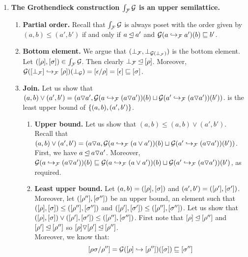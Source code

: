 \begin{enumerate}
\item {\bf The Grothendieck construction $\grothy{\ulbF}{\ulbG}$ is an upper semilattice.}
  \begin{enumerate}
  \item {\bf Partial order.}
    Recall that $\grothy{\ulbF}{\ulbG}$ is always poset
    with the order given by $(a,b) \leq (a',b')$ if and only if
    $a \leqF a'$ and $\ulbG(\ptF{a'}{a})(b) \permle b'$.
  \item {\bf Bottom element.}
    We argue that $(\bot_{\ulbF},\bot_{\ulbG(\bot_\ulbF)})$ is the bottom
    element. Let $(\cls{\redseq},\cls{\redseqtwo}) \in \grothy{\ulbF}{\ulbG}$.
    Then clearly $\bot_{\ulbF} \leqF \cls{\redseq}$. Moreover,
    $
     \ulbG(\ptF{[\redseq]}{[\bot_{\ulbF}]})(\bot_\ulbG) =
     [\emptyDerivation/\redseq] = [\emptyDerivation] \permle \cls{\redseqtwo}
    $.
  \item {\bf Join.}
    Let us show that $(a, b) \lor (a',b') = (a \lorF a', \ulbG(\ptF{(a \lorF a')}{a})(b) \sqcup \ulbG(\ptF{(a \lorF a')}{a'})(b'))$.
    is the least upper bound of $\set{(a, b), (a',b')}$.
    \begin{enumerate}
    \item {\bf Upper bound.}
      Let us show that $(a, b) \leq (a, b) \lor (a',b')$.
      Recall that $(a, b) \lor (a', b') = (a \lorF a, \ulbG(\ptF{(a \lor a')}{a})(b) \sqcup \ulbG(\ptF{(a \lorF a')}{a'})(b'))$.
      First, we have $a \leqF a \lorF a'$.
      Moreover, $\ulbG(\ptF{(a \lorF a')}{a})(b) \permle \ulbG(\ptF{(a \lor a')}{a})(b) \sqcup \ulbG(\ptF{(a \lorF a')}{a'})(b')$, as required.
    \item {\bf Least upper bound.}
      Let $(a,b) = (\cls{\redseq},\cls{\redseqtwo})$
      and $(a',b') = (\cls{\redseq'},\cls{\redseqtwo'})$.
      Moreover, let $(\cls{\redseq''},\cls{\redseqtwo''})$ be an upper bound,
      \ie an element
      such that $(\cls{\redseq},\cls{\redseqtwo}) \leq (\cls{\redseq''},\cls{\redseqtwo''})$
      and $(\cls{\redseq'},\cls{\redseqtwo'}) \leq (\cls{\redseq''},\cls{\redseqtwo''})$.
      Let us show that
      $(\cls{\redseq},\cls{\redseqtwo}) \lor (\cls{\redseq'},\cls{\redseqtwo'}) \leq (\cls{\redseq''},\cls{\redseqtwo''})$.
      First note that $\cls{\redseq} \leqF \cls{\redseq''}$ and $\cls{\redseq'} \leqF \cls{\redseq''}$
      so $\cls{\redseq} \lorF \cls{\redseq'} \leqF \cls{\redseq''}$.\\
      Moreover, we know that:
      \[
        \cls{\redseq\redseqtwo/\redseq''} = \ulbG(\pt{\cls{\redseq''}}{\cls{\redseq}})(\cls{\redseqtwo}) \permle \cls{\redseqtwo''}
\]
\end{enumerate}
\end{enumerate}
\end{enumerate}
